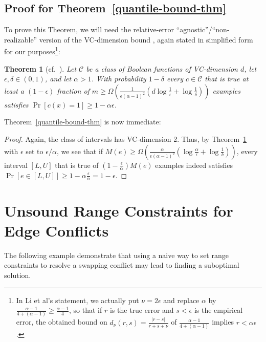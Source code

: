 \documentclass[jair,twoside,11pt,theapa]{article}
\newtheorem{theorem}{Theorem}
\begin{document}
\subsection{Proof for Theorem~\ref{quantile-bound-thm}}
To prove this Theorem, we will need the relative-error ``agnostic''/``non-realizable'' version of the VC-dimension bound , again stated in simplified form for our purposes\footnote{%
In Li et al's statement, we actually put $\nu=2\epsilon$ and replace $\alpha$ by $\frac{\alpha-1}{4+(\alpha-1)}\geq \frac{\alpha-1}{4}$, so that if $r$ is the true error and $s<\epsilon$ is the empirical error, the obtained bound on $d_\nu(r,s)=\frac{|r-s|}{r+s+\nu}$ of $\frac{\alpha-1}{4+(\alpha-1)}$ implies $r<\alpha\epsilon$.}:
\begin{theorem}[cf.~]\label{optimal-agnostic-vc-bound}
Let $\mathcal{C}$ be a class of Boolean functions of VC-dimension $d$, let $\epsilon,\delta\in (0,1)$, and let $\alpha >1$. With probability $1-\delta$ every $c\in\mathcal{C}$ that is true at least a $(1-\epsilon)$ fraction of $m\geq \Omega(\frac{1}{\epsilon(\alpha-1)^2}(d\log\frac{1}{\epsilon}+\log\frac{1}{\delta}))$ examples satisfies $\Pr[c(x)=1]\geq 1-\alpha\epsilon$.
\end{theorem}

Theorem~\ref{quantile-bound-thm} is now immediate:
\begin{proof}
Again, the class of intervals has VC-dimension 2. Thus, by Theorem~\ref{optimal-agnostic-vc-bound} with $\epsilon$ set to $\epsilon/\alpha$, we see that if $M(e)\geq\Omega(\frac{\alpha}{\epsilon(\alpha-1)^2}(\log\frac{\alpha}{\epsilon}+\log\frac{1}{\delta}))$, every interval $[L,U]$ that is true of $(1-\frac{\epsilon}{\alpha})M(e)$ examples indeed satisfies $\Pr[e\in [L,U]]\geq 1-\alpha\frac{\epsilon}{\alpha}=1-\epsilon$.
\end{proof}



\section{Unsound Range Constraints for Edge Conflicts}
\label{appendix:edge-constraint}

The following example demonstrate that using a naive way to set range constraints to resolve a swapping conflict may lead to finding a suboptimal solution.   
\end{document}
